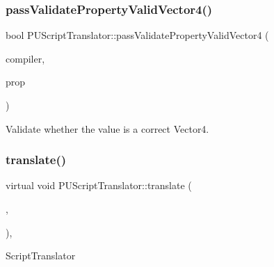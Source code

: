 \subsubsection{\texorpdfstring{pass\+Validate\+Property\+Valid\+Vector4()}{passValidatePropertyValidVector4()}\hspace{0.1cm}{\footnotesize\ttfamily [2/2]}}
{\footnotesize\ttfamily bool P\+U\+Script\+Translator\+::pass\+Validate\+Property\+Valid\+Vector4 (\begin{DoxyParamCaption}\item[{\hyperlink{classPUScriptCompiler}{P\+U\+Script\+Compiler} $\ast$}]{compiler,  }\item[{\hyperlink{classPUPropertyAbstractNode}{P\+U\+Property\+Abstract\+Node} $\ast$}]{prop }\end{DoxyParamCaption})}

Validate whether the value is a correct Vector4. \mbox{\label{classPUScriptTranslator_a28c7dd511a1057a136eb1b1703bce699}} 
\subsubsection{\texorpdfstring{translate()}{translate()}\hspace{0.1cm}{\footnotesize\ttfamily [1/2]}}
{\footnotesize\ttfamily virtual void P\+U\+Script\+Translator\+::translate (\begin{DoxyParamCaption}\item[{\hyperlink{classPUScriptCompiler}{P\+U\+Script\+Compiler} $\ast$}]{,  }\item[{\hyperlink{classPUAbstractNode}{P\+U\+Abstract\+Node} $\ast$}]{ }\end{DoxyParamCaption})\hspace{0.3cm}{\ttfamily [inline]}, {\ttfamily [virtual]}}

Script\+Translator 

